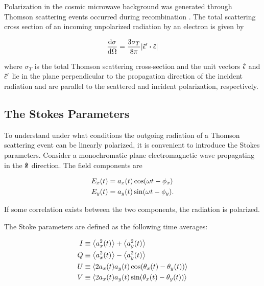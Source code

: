 Polarization in the cosmic microwave background was generated through
Thomson scattering events occurred during recombination
\autocite{kosowsky1999introduction}. The total scattering cross section of
an incoming unpolarized radiation by an electron is given by

\begin{equation}
        \dv{\sigma}{\Omega} = \frac{3\sigma_T}{8\pi}
        \abs{\vectorunit{\epsilon}' \vdot \vectorunit{\epsilon}}
        \label{eq:thomson_csection}
\end{equation}

where $\sigma_T$ is the total Thomson scattering cross-section and the unit
vectors $\vectorunit{\epsilon}$ and $\vectorunit{\epsilon}'$ lie in the
plane perpendicular to the propagation direction of the incident radiation
and are parallel to the scattered and incident polarization, respectively.

\subsection{The Stokes Parameters}

To understand under what conditions the outgoing radiation of a Thomson
scattering event can be linearly polarized, it is convenient to introduce the
Stokes parameters. Consider a monochromatic plane electromagnetic wave
propagating in the $\vectorunit{z}$ direction. The field components are

\begin{align}
        E_x\qty(t) & = a_x\qty(t)\cos(\omega t - \phi_x) \\
        E_y\qty(t) & = a_y\qty(t)\sin(\omega t - \phi_y).
\end{align}

If some correlation exists between the two components, the radiation is
polarized.

The Stoke parameters are defined as the following time averages:

\begin{align}
        I & \equiv \expval{a^2_x\qty(t)} + \expval{a^2_y\qty(t)} \\
        Q & \equiv \expval{a^2_x\qty(t)} - \expval{a^2_y\qty(t)} \\
        U & \equiv \expval{2a_x\qty(t)a_y\qty(t)
        \cos(\theta_x\qty(t) - \theta_y\qty(t))} \\
        V & \equiv \expval{2a_x\qty(t)a_y\qty(t)
        \sin(\theta_x\qty(t) - \theta_y\qty(t))}
\end{align}

